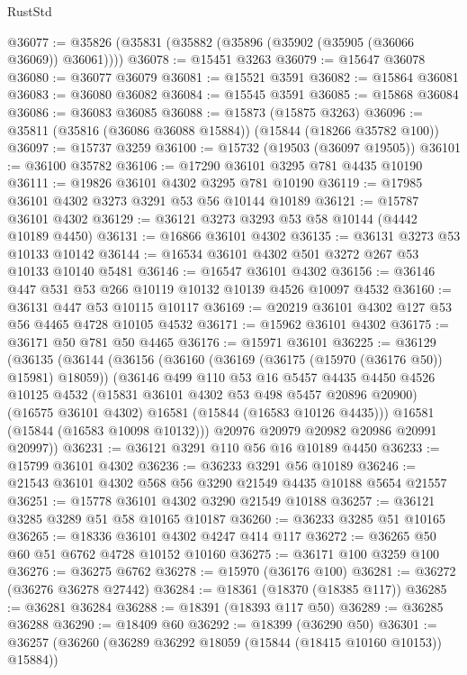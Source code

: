 \begin{lexlean}{RustStd}
\begin{coremodule}
@36077 := @35826 (@35831 (@35882 (@35896 (@35902 (@35905 (@36066 @36069)) @36061))))
@36078 := @15451 @3263
@36079 := @15647 @36078
@36080 := @36077 @36079
@36081 := @15521 @3591
@36082 := @15864 @36081
@36083 := @36080 @36082
@36084 := @15545 @3591
@36085 := @15868 @36084
@36086 := @36083 @36085
@36088 := @15873 (@15875 @3263)
@36096 := @35811 (@35816 (@36086 @36088 @15884)) (@15844 (@18266 @35782 @100))
@36097 := @15737 @3259
@36100 := @15732 (@19503 (@36097 @19505))
@36101 := @36100 @35782
@36106 := @17290 @36101 @3295 @781 @4435 @10190
@36111 := @19826 @36101 @4302 @3295 @781 @10190
@36119 := @17985 @36101 @4302 @3273 @3291 @53 @56 @10144 @10189
@36121 := @15787 @36101 @4302
@36129 := @36121 @3273 @3293 @53 @58 @10144 (@4442 @10189 @4450)
@36131 := @16866 @36101 @4302
@36135 := @36131 @3273 @53 @10133 @10142
@36144 := @16534 @36101 @4302 @501 @3272 @267 @53 @10133 @10140 @5481
@36146 := @16547 @36101 @4302
@36156 := @36146 @447 @531 @53 @266 @10119 @10132 @10139 @4526 @10097 @4532
@36160 := @36131 @447 @53 @10115 @10117
@36169 := @20219 @36101 @4302 @127 @53 @56 @4465 @4728 @10105 @4532
@36171 := @15962 @36101 @4302
@36175 := @36171 @50 @781 @50 @4465
@36176 := @15971 @36101
@36225 := @36129
    (@36135
      (@36144
        (@36156
          (@36160 (@36169 (@36175 (@15970 (@36176 @50)) @15981) @18059))
          (@36146
            @499
            @110
            @53
            @16
            @5457
            @4435
            @4450
            @4526
            @10125
            @4532
            (@15831 @36101 @4302 @53 @498 @5457 @20896 @20900)
            (@16575 @36101 @4302)
            @16581
            (@15844 (@16583 @10126 @4435)))
          @16581
          (@15844 (@16583 @10098 @10132)))
        @20976
        @20979
        @20982
        @20986
        @20991
        @20997))
@36231 := @36121 @3291 @110 @56 @16 @10189 @4450
@36233 := @15799 @36101 @4302
@36236 := @36233 @3291 @56 @10189
@36246 := @21543 @36101 @4302 @568 @56 @3290 @21549 @4435 @10188 @5654 @21557
@36251 := @15778 @36101 @4302 @3290 @21549 @10188
@36257 := @36121 @3285 @3289 @51 @58 @10165 @10187
@36260 := @36233 @3285 @51 @10165
@36265 := @18336 @36101 @4302 @4247 @414 @117
@36272 := @36265 @50 @60 @51 @6762 @4728 @10152 @10160
@36275 := @36171 @100 @3259 @100
@36276 := @36275 @6762
@36278 := @15970 (@36176 @100)
@36281 := @36272 (@36276 @36278 @27442)
@36284 := @18361 (@18370 (@18385 @117))
@36285 := @36281 @36284
@36288 := @18391 (@18393 @117 @50)
@36289 := @36285 @36288
@36290 := @18409 @60
@36292 := @18399 (@36290 @50)
@36301 := @36257 (@36260 (@36289 @36292 @18059 (@15844 (@18415 @10160 @10153)) @15884))

\end{coremodule}
\end{lexlean}
